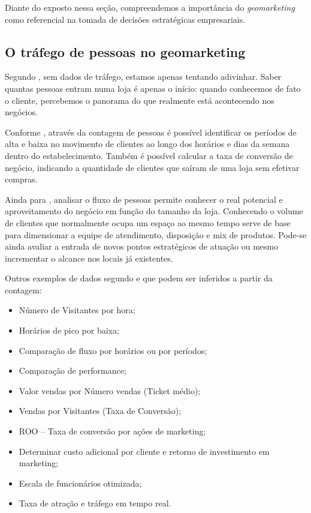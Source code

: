 Diante do exposto nessa seção, compreendemos a importância do \emph{geomarketing} como
referencial na tomada de decisões estratégicas empresariais.

\subsection{O tráfego de pessoas no geomarketing}

Segundo , sem dados de tráfego, estamos apenas tentando adivinhar. Saber quantas pessoas entram numa loja é apenas o início: quando conhecemos de fato o cliente, percebemos o panorama do que realmente está acontecendo nos negócios.

Conforme , através da contagem de pessoas é possível identificar os períodos de alta e baixa no movimento de clientes ao longo dos horários e dias da semana dentro do estabelecimento. Também é possível calcular a taxa de conversão de negócio, indicando a quantidade de clientes que saíram de uma loja sem efetivar compras.

Ainda para , analisar o fluxo de pessoas permite conhecer o real potencial e aproveitamento do negócio em função do tamanho da loja. Conhecendo o volume de clientes que normalmente ocupa um espaço ao mesmo tempo serve de base para dimensionar a equipe de atendimento, disposição e mix de produtos. Pode-se ainda avaliar a entrada de novos pontos estratégicos de atuação ou mesmo incrementar o alcance nos locais já existentes.

Outros exemplos de dados segundo  e  que podem ser inferidos a partir da contagem:

\begin{itemize}
  \item Número de Visitantes por hora;
  \item Horários de pico por baixa;
  \item Comparação de fluxo por horários ou por períodos;
  \item Comparação de performance;
  \item Valor vendas por Número vendas (Ticket médio);
  \item Vendas por Visitantes (Taxa de Conversão);
  \item ROO – Taxa de conversão por ações de marketing;
  \item Determinar custo adicional por cliente e retorno de investimento em marketing;
  \item Escala de funcionários otimizada;
  \item Taxa de atração e tráfego em tempo real.
\end{itemize}

